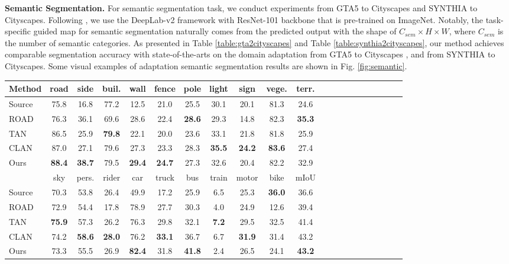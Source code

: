 \documentclass[runningheads]{llncs}
\begin{document}
\noindent \textbf{Semantic Segmentation.}
For semantic segmentation task, we conduct experiments from GTA5 \cite{DBLP:conf/eccv/RichterVRK16} to Cityscapes \cite{DBLP:conf/cvpr/CordtsORREBFRS16} and SYNTHIA \cite{DBLP:conf/cvpr/RosSMVL16} to Cityscapes. Following \cite{DBLP:conf/cvpr/Luo0GYY19}, we use the DeepLab-v2 \cite{DBLP:journals/pami/ChenPKMY18} framework with ResNet-101 backbone that is pre-trained on ImageNet. Notably, the task-specific guided map for semantic segmentation naturally comes from the predicted output with the shape of $C_{sem}\times H\times W$, where $C_{sem}$ is the number of semantic categories. As presented in Table \ref{table:gta2cityscapes} and Table \ref{table:synthia2cityscapes}, our method achieves comparable segmentation accuracy with state-of-the-arts on the domain adaptation from GTA5 \cite{DBLP:conf/eccv/RichterVRK16} to Cityscapes \cite{DBLP:conf/cvpr/CordtsORREBFRS16}, and from SYNTHIA \cite{DBLP:conf/cvpr/RosSMVL16} to Cityscapes. Some visual examples of adaptation semantic segmentation results are shown in Fig. \ref{fig:semantic}.
\begin{table*}[t]
\centering
\caption{Adaptation semantic segmentation results from GTA5 to Cityscapes.}
\setlength{\tabcolsep}{3.0pt}
\begin{tabular}{l|ccccccccccccccccccc|c}
\hline
Method & road &side &buil. &wall &fence &pole &light &sign &vege. &terr. \\
\hline
Source &75.8 &16.8 &77.2 &12.5 &21.0 &25.5 &30.1 &20.1 &81.3 &24.6  \\
ROAD \cite{DBLP:conf/cvpr/Chen0G18} &76.3 &36.1 &69.6 &28.6 &22.4 &\bf28.6 &29.3 &14.8 &82.3 &\bf35.3 \\
TAN \cite{DBLP:conf/cvpr/TsaiHSS0C18} &86.5 &25.9 &\bf79.8 &22.1 &20.0 &23.6 &33.1 &21.8 &81.8 &25.9  \\
CLAN \cite{DBLP:conf/cvpr/Luo0GYY19} &87.0 &27.1 &79.6 &27.3 &23.3 &28.3 &\bf35.5 &\bf24.2 &\bf83.6 &27.4  \\
Ours &{\bf 88.4} &{\bf 38.7} &79.5 &{\bf 29.4} &{\bf 24.7} &27.3 & 32.6& 20.4 &82.2 &32.9 \\
\hline
\hline
&sky  &pers. &rider &car &truck &bus &train &motor &bike &mIoU \\
Source &70.3 &53.8 &26.4 &49.9 &17.2 &25.9 &6.5 &25.3 &\bf36.0 &36.6 \\
ROAD \cite{DBLP:conf/cvpr/Chen0G18} &72.9 &54.4 &17.8 &78.9 &27.7 &30.3 &4.0 &24.9 &12.6 &39.4 \\
TAN \cite{DBLP:conf/cvpr/TsaiHSS0C18} &\bf75.9 &57.3 &26.2 &76.3 &29.8 &32.1 &\bf7.2 &29.5 &32.5 &41.4 \\
CLAN \cite{DBLP:conf/cvpr/Luo0GYY19} &74.2 &\bf58.6 &\bf28.0 &76.2 &\bf33.1 &36.7 &6.7 &\bf31.9 &31.4 &43.2 \\
Ours &73.3 &55.5 &26.9 &{\bf 82.4} &31.8 &{\bf 41.8} &2.4 &26.5 &24.1 &{\bf 43.2} \\
\hline
\end{tabular}
\label{table:gta2cityscapes}
\end{table*}
\end{document}
